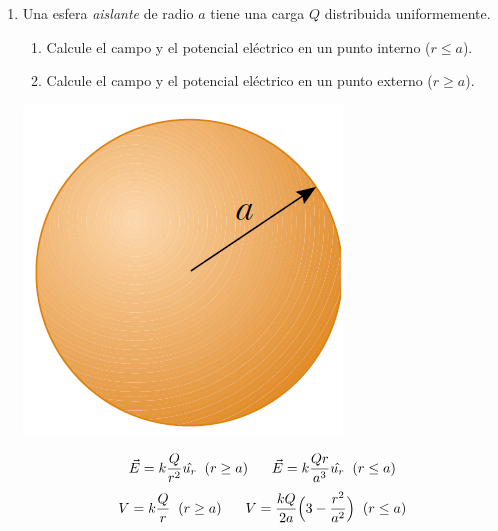 \documentclass[11pt,twocolumn]{article}
\begin{document}
\begin{enumerate}
\item Una esfera \textit{aislante} de radio $a$ tiene una carga $Q$ distribuida uniformemente. 
\begin{enumerate}
\item Calcule el campo y el potencial eléctrico en un punto interno ($r \leq a$).  
\item Calcule el campo y el potencial eléctrico en un punto externo ($r\geq a$).  
\end{enumerate}
{
\begin{center}
\includegraphics[scale=0.2]{esfera}
\end{center}
}
\begin{displaymath}
\vec{E}=k\dfrac{Q}{r^2}\hat{u_{r}} \hspace{0.2 cm} (r \geq a) \hspace{0.6 cm} \vec{E}=k\dfrac{Q r}{a^3}\hat{u_{r}} \hspace{0.2 cm} (r \leq a)
\end{displaymath}
\begin{displaymath}
V=k\dfrac{Q}{r} \hspace{0.2 cm} (r\geq a) \hspace{0.6 cm} V=\dfrac{kQ}{2a}\Big(3-\dfrac{r^2}{a^2}\Big) \hspace{0.2 cm} (r\leq a)
\end{displaymath}


\end{enumerate}
\end{document}

